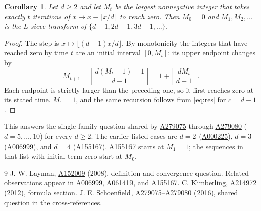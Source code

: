 \documentclass[11pt]{article}
\newtheorem{corollary}[theorem]{Corollary}
\newcommand{\oeis}[1]{\href{https://oeis.org/#1}{\textup{#1}}}
\begin{document}
\begin{corollary}\label{cor:stopping}
Let $d\ge2$ and let $M_t$ be the largest nonnegative integer that takes
exactly $t$ iterations of $x\mapsto x-\lceil x/d\rceil$ to reach zero.
Then $M_0=0$ and $M_1,M_2,\ldots$ is the $L$-sieve transform of
$\{d-1,2d-1,3d-1,\ldots\}$.
\end{corollary}
\begin{proof}
The step is $x\mapsto\lfloor(d-1)x/d\rfloor$. By monotonicity the integers
that have reached zero by time $t$ are an initial interval $[0,M_t]$:
its upper endpoint changes by
\[
 M_{t+1}=\left\lfloor\frac{d(M_t+1)-1}{d-1}\right\rfloor
       =1+\left\lfloor\frac{dM_t}{d-1}\right\rfloor .
\]
Each endpoint is strictly larger than the preceding one, so it first
reaches zero at its stated time. $M_1=1$, and the same recursion follows
from \eqref{eq:res} for $c=d-1$.
\end{proof}
This answers the single family question shared by \oeis{A279075} through
\oeis{A279080} ($d=5,\ldots,10$) for every $d\ge2$. The earlier listed
cases are $d=2$ (\oeis{A000225}), $d=3$ (\oeis{A006999}), and $d=4$
(\oeis{A155167}). A155167 starts at $M_1=1$; the sequences in that list
with initial term zero start at $M_0$.

\begin{thebibliography}{9}
 J. W. Layman, \oeis{A152009} (2008), definition and convergence
question. Related observations appear in \oeis{A006999}, \oeis{A061419},
and \oeis{A155167}.
 C. Kimberling, \oeis{A214972} (2012), formula section.
 J. E. Schoenfield, \oeis{A279075}--\oeis{A279080}
(2016), shared question in the cross-references.
\end{thebibliography}
\end{document}
